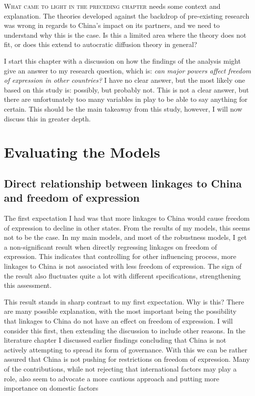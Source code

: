 \lettrine{W}{hat came to light in the preceding chapter} needs some context and explanation. The theories developed against the backdrop of pre-existing research was wrong in regards to China's impact on its partners, and we need to understand why this is the case. Is this a limited area where the theory does not fit, or does this extend to autocratic diffusion theory in general?

I start this chapter with a discussion on how the findings of the analysis might give an answer to my research question, which is: \textit{can major powers affect freedom of expression in other countries?} I have no clear answer, but the most likely one based on this study is: possibly, but probably not. This is not a clear answer, but there are unfortunately too many variables in play to be able to say anything for certain. This should be the main takeaway from this study, however, I will now discuss this in greater depth.

\section{Evaluating the Models}

\subsection{Direct relationship between linkages to China and freedom of expression}
The first expectation I had was that more linkages to China would cause freedom of expression to decline in other states. From the results of my models, this seems not to be the case. In my main models, and most of the robustness models, I get a non-significant result when directly regressing linkages on freedom of expression. This indicates that controlling for other influencing process, more linkages to China is not associated with less freedom of expression. The sign of the result also fluctuates quite a lot with different specifications, strengthening this assessment.

This result stands in sharp contrast to my first expectation. Why is this? There are many possible explanation, with the most important being the possibility that linkages to China do not have an effect on freedom of expression. I will consider this first, then extending the discussion to include other reasons. In the literature chapter I discussed earlier findings concluding that China is not actively attempting to spread its form of governance. With this we can be rather assured that China is not pushing for restrictions on freedom of expression. Many of the contributions, while not rejecting that international factors may play a role, also seem to advocate a more cautious approach and putting more importance on domestic factors \citep{bader_china_2015, }

